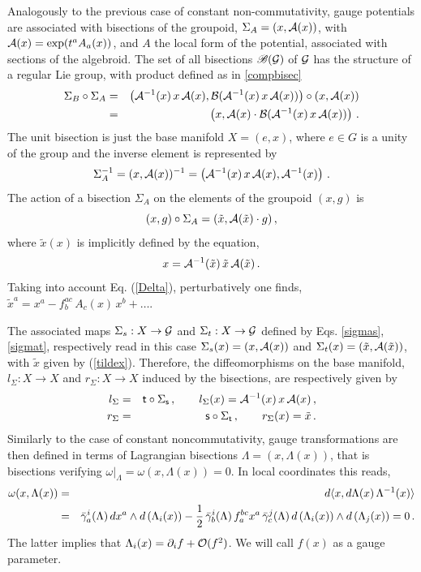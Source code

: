 \documentclass[12pt,a4paper]{article}
\numberwithin{equation}{section}
\theoremstyle{definition}
\newcommand{\sfs}{\mathsf{s}}
\newcommand{\sft}{\mathsf{t}}
\newcommand{\bea}{\begin{eqnarray}}
\newcommand{\eea}{\end{eqnarray}}
\newcommand{\eqn}{\eqref}
\begin{document}
{Analogously to the previous case of constant non-commutativity, gauge potentials are associated with bisections of the groupoid,   $\Sigma_A=(x,{\cal A}(x))$, with ${\cal A}(x)=\exp(t^aA_a(x))$, and $A$ the local form of the potential, associated with sections of the algebroid.} The set of all bisections $\mathscr{B}(\cal{G})$ of $\cal{G}$ has the  structure  of a regular Lie group, with product defined as in  \eqn{compbisec} 
\begin{eqnarray}\label{mbi}
\Sigma_B\circ \Sigma_A&=&\left({\cal A}^{-1}(x)\,x\,{\cal A}(x),{\cal B}({\cal A}^{-1}(x)\,x\,{\cal A}(x))\right)\circ \left(x,{\cal A}(x)\right)\\
&=&\left(x, {\cal A}(x)\cdot {\cal B}({\cal A}^{-1}(x)\,x\,{\cal A}(x))\right)\,.\notag
\end{eqnarray}
The unit bisection is just the base manifold $X=(e,x)$, where $e\in G$ is a unity of the group and the inverse element is represented by
\begin{equation}
\Sigma^{-1}_A=(x,{\cal A}(x))^{-1}=\left({\cal A}^{-1}(x)\,x\,{\cal A}(x),{\cal A}^{-1}(x)\right)\,.
\end{equation}
The action of a bisection $\Sigma_A$ on the elements of the groupoid $(x,g)$ is
\begin{equation}
(x,g)\circ \Sigma_A=\left(\tilde x, {\cal A}(\tilde x)\cdot g\right),
\end{equation}
where $\tilde x(x)$  is implicitly defined by the equation, 
\begin{equation}\label{tildex}
x={\cal A}^{-1}(\tilde x)\,\tilde x\,{\cal A}(\tilde x)\,.
\end{equation}
Taking into account Eq. (\ref{Delta}),  perturbatively one finds, $\tilde x^a=x^a-f^{ac}_b\,A_c(x)\,x^b+\dots$. 

The associated  maps $\Sigma_s: X\to  \cal{G}$ and $\Sigma_t: X\to  \cal{G}$ defined by Eqs. \eqn{sigmas}, \eqn{sigmat},  respectively read in this case $\Sigma_s(x)=(x,{\cal A}(x))$ and $\Sigma_t(x)=(\tilde x,{\cal A}(\tilde x))$, with $\tilde x$ given by (\ref{tildex}). Therefore, the  diffeomorphisms on the base manifold, $l_\Sigma: X\to X$ and $r_\Sigma: X\to X$ induced by the bisections, are respectively given by
\bea
l_\Sigma&=&\sft\circ \Sigma_\sfs\,,\qquad l_\Sigma(x)={\cal A}^{-1}(x)\,x\,{\cal A}(x)\,,\\
r_\Sigma&=&\sfs\circ \Sigma_\sft\,,\qquad r_\Sigma(x)=\tilde x\,.
\eea
Similarly to the case of constant noncommutativity, gauge transformations are then defined in terms of  Lagrangian bisections $\Lambda=(x,\Lambda(x))$,  that is bisections verifying  $\left.\omega\right|_\Lambda=\omega(x,\Lambda(x))=0$. In local coordinates this reads,
\begin{eqnarray}\label{omegaL}
\omega(x,\Lambda(x))&=&d\langle x,d\Lambda( x)\,\Lambda^{-1}( x)\rangle\\
&=&\bar\gamma_a^i(\Lambda)\,dx^a\wedge d\left(\Lambda_i(x)\right)-\frac12\,\bar\gamma_b^i(\Lambda)\,f_a^{bc}x^a\,\bar\gamma_c^j(\Lambda)\,d\left(\Lambda_i(x)\right)\wedge d\left(\Lambda_j(x)\right)=0\,.\notag
\end{eqnarray}
The latter implies that $\Lambda_i(x)=\partial_if+{\cal O}(f^2)$.  We will call $f (x)$ as a gauge parameter. 
\end{document}
